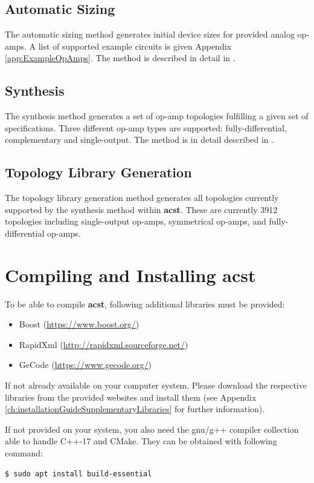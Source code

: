 \section{Automatic Sizing}\label{sec:OverviewAutomaticSizing}
The automatic sizing method generates initial device sizes for provided analog op-amps. A list of  supported example circuits is given Appendix \ref{app:ExampleOpAmps}.
The method is described in detail in \cite{ABNG20c}.

\section{Synthesis}\label{sec:OverviewSynthesis}
The synthesis method  generates a set of op-amp topologies fulfilling a given set of specifications. Three different op-amp types are supported: fully-differential, complementary and single-output. The method is in detail described in \cite{ABNG20d,SMACD}.

\section{Topology Library Generation}\label{sec:OverviewTopologyLibraryGeneration}
The topology library generation method generates all topologies currently supported by the synthesis method within {\bf acst}. These are currently 3912 topologies including single-output op-amps, symmetrical op-amps, and fully-differential op-amps.


\chapter{Compiling and Installing  acst}\label{ch:CompilingAndInstallingAcst}
To be able to compile {\bf acst}, following additional libraries must be provided:
\begin{itemize}
	\item Boost (\url{https://www.boost.org/})
	\item RapidXml (\url{http://rapidxml.sourceforge.net/})
	\item GeCode (\url{https://www.gecode.org/})
\end{itemize}
If not already available on your computer system. Please download the respective libraries from the provided websites and install them (see Appendix \ref{ch:installationGuideSupplementaryLibraries} for further information).

If not provided on your system, you also need the gnu/g++ compiler collection able to handle C++-17 and CMake. They can be obtained with following command:
\begin{lstlisting}[basicstyle=\ttfamily\scriptsize,backgroundcolor={\color{gray!30}}, escapechar=!]
$ sudo apt install build-essential	
\end{lstlisting}

